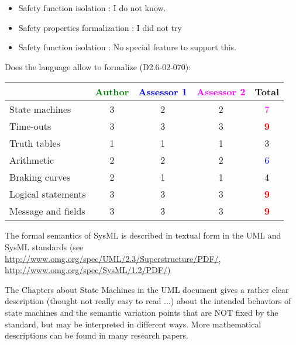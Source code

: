 \begin{author_comment}
\begin{itemize}
\item Safety function isolation :  I do not know.
\item Safety properties formalization : I did not try
\end{itemize}

\end{author_comment}

\begin{assessor1}
\begin{itemize}
\item Safety function isolation :  No special feature to support this.
\end{itemize}

\end{assessor1}

Does the language allow to formalize (D2.6-02-070):

\begin{tabular}{|l | c | c | c | c|}
\hline
& \textcolor{green}{Author} & \textcolor{blue}{Assessor 1} & \textcolor{magenta}{Assessor 2} & Total \\
\hline 
State machines  &3 & 2   & 2   & \textcolor{magenta}{7} \\
\hline
Time-outs  &3 & 3   & 3   & \textcolor{red}{\textbf{9}} \\
\hline
Truth tables  &1 & 1   & 1   & 3    \\
\hline
Arithmetic  & 2   & 2   & 2   & \textcolor{blue}{6} \\
\hline
Braking curves  &2 & 1   & 1   & 4    \\
\hline
Logical statements &3 & 3   & 3   & \textcolor{red}{\textbf{9}} \\
\hline
Message and fields &3 & 3   & 3   & \textcolor{red}{\textbf{9}} \\
\hline
\end{tabular}
\begin{author_comment}

The formal semantics of SysML is described in textual form in the UML and SysML standards
(see \url{http://www.omg.org/spec/UML/2.3/Superstructure/PDF/}, \url{http://www.omg.org/spec/SysML/1.2/PDF/})

The Chapters about State Machines in the UML
document gives a rather clear description (thought not really easy
to read ...) about the intended behaviors of state machines and the
semantic variation points that are NOT fixed by the standard, but may
be interpreted in different ways. More mathematical descriptions can
be found in  many research papers.
\end{author_comment}

